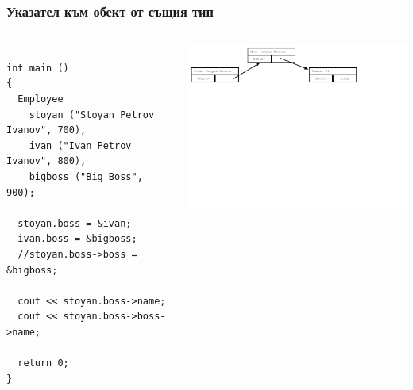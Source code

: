 \documentclass{beamer}
\begin{document}
\begin{frame}[fragile]
\frametitle{Указател към обект от същия тип}

\begin{columns}[c]
  \begin{column}{0.55\textwidth}
\begin{flushleft}
\begin{lstlisting}

int main ()
{
  Employee 
    stoyan ("Stoyan Petrov Ivanov", 700),
    ivan ("Ivan Petrov Ivanov", 800),
    bigboss ("Big Boss", 900);

  stoyan.boss = &ivan;
  ivan.boss = &bigboss;
  //stoyan.boss->boss = &bigboss;
  
  cout << stoyan.boss->name;
  cout << stoyan.boss->boss->name;

  return 0;
}

\end{lstlisting}  
\end{flushleft}

  \end{column}
  \begin{column}{0.45\textwidth}
\hspace{-150px}
\includegraphics[width=10.5cm]{images/00_rec_obj_three_objects_linked.pdf}

  \end{column}
\end{columns}
\end{frame}
\end{document}
